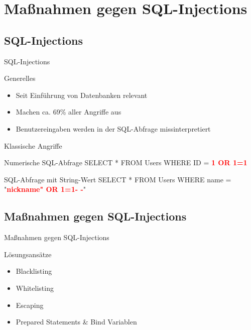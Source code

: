 \section{Maßnahmen gegen SQL-Injections}

\subsection{SQL-Injections}
\begin{frame}{SQL-Injections}
\begin{block}{Generelles}
\begin{itemize}
	\item Seit Einführung von Datenbanken relevant
	\item Machen ca. 69\% aller Angriffe aus \footnotemark
	\item Benutzereingaben werden in der SQL-Abfrage missinterpretiert
\end{itemize}
\end{block}
\end{frame}

\begin{frame}{Klassische Angriffe}
\begin{block}{Numerische SQL-Abfrage}
	SELECT * FROM Users WHERE ID = \textcolor{red}{\textbf{1 OR 1=1}}
\end{block}
\begin{block}{SQL-Abfrage mit String-Wert}
	SELECT * FROM Users WHERE name = "{}\textcolor{red}{\textbf{nickname"{} OR 1=1- -}}"{}
\end{block}
\end{frame}


\subsection{Maßnahmen gegen SQL-Injections}
\begin{frame}{Maßnahmen gegen SQL-Injections}
\begin{block}{Lösungsansätze}
\begin{itemize}
\item Blacklisting 
\item Whitelisting
\item Escaping
\item Prepared Statements \& Bind Variablen
\end{itemize}
\end{block}
\end{frame}

